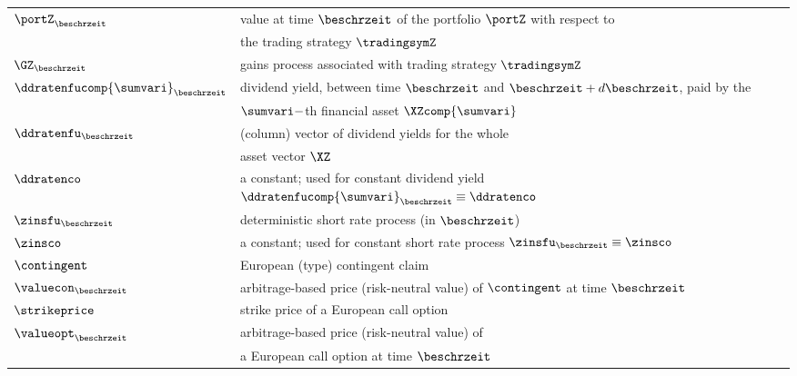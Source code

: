 \begin{longtable}{ll}
\hspace{-0.33cm} $\portZ_{\beschrzeit}$ &  value at time $\beschrzeit$ of the
portfolio $\portZ$ with respect to 
\\
\hspace{-0.33cm} $\ $ & the trading strategy $\tradingsymZ$
\\
\hspace{-0.33cm} $\GZ_{\beschrzeit}$ & gains process associated with trading strategy $\tradingsymZ$
\\
\hspace{-0.33cm} $\ddratenfucomp{\sumvari}_{\beschrzeit}$ & dividend yield,
between time ${\beschrzeit}$ and ${\beschrzeit} + d{\beschrzeit}$, paid by the
\\
\hspace{-0.33cm} $\ $ &  ${\sumvari}-$th financial asset $\XZcomp{\sumvari}$ 
\\
\hspace{-0.33cm} $\ddratenfu_{\beschrzeit}$ & (column) vector of dividend yields
for the whole
\\ 
\hspace{-0.33cm} $\ $ &  asset vector $\XZ$ 
\\
\hspace{-0.33cm} $\ddratenco$  & a constant; used for constant dividend yield  $\ddratenfucomp{\sumvari}_{\beschrzeit} \equiv \ddratenco$
\\
\hspace{-0.33cm} ${\zinsfu}_{\beschrzeit}$ & deterministic short rate process (in $\beschrzeit$) 
\\
\hspace{-0.33cm} $\zinsco$  & a constant; used for constant short rate process  ${\zinsfu}_{\beschrzeit} \equiv \zinsco$
\\
\hspace{-0.33cm} $\contingent$ & European (type) contingent claim
\\
\hspace{-0.33cm} $\valuecon_{\beschrzeit}$ & arbitrage-based price (risk-neutral value) of $\contingent$  at time ${\beschrzeit}$
\\
\hspace{-0.33cm} $\strikeprice$ & strike price of a European call option
\\
\hspace{-0.33cm} $\valueopt_{\beschrzeit}$ & arbitrage-based price (risk-neutral value) of  
\\
\hspace{-0.33cm} $\ $ & a European call option at time ${\beschrzeit}$

\end{longtable}
